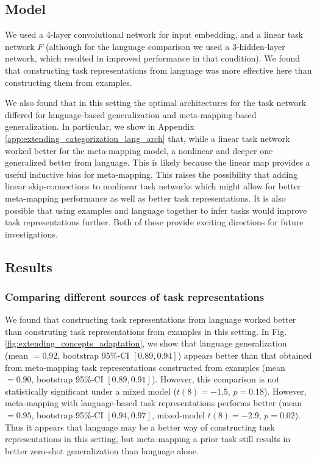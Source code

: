 \subsection{Model}
We used a 4-layer convolutional network for input embedding, and a linear task network \(F\) (although for the language comparison we used a 3-hidden-layer network, which resulted in improved performance in that condition). We found that constructing task representations from language was more effective here than constructing them from examples. \par
We also found that in this setting the optimal architectures for the task network differed for language-based generalization and meta-mapping-based generalization. In particular, we show in Appendix \ref{app:extending_categorization_lang_arch} that, while a linear task network worked better for the meta-mapping model, a nonlinear and deeper one generalized better from language. This is likely because the linear map provides a useful inductive bias for meta-mapping. This raises the possibility that adding linear skip-connections to nonlinear task networks which might allow for better meta-mapping performance as well as better task representations. It is also possible that using examples and language together to infer tasks would improve task representations further. Both of these provide exciting directions for future investigations. \par 

\subsection{Results}

\subsubsection{Comparing different sources of task representations}
We found that constructing task representations from language worked better than construting task representations from examples in this setting. In Fig. \ref{fig:extending_concepts_adaptation}, we show that language generalization (mean \(= 0.92\), bootstrap 95\%-CI \([0.89, 0.94]\)) appears better than that obtained from meta-mapping task representations constructed from examples (mean \(= 0.90\), bootstrap 95\%-CI \([0.89, 0.91]\)). However, this comparison is not statistically significant under a mixed model (\(t(8) = -1.5\), \(p = 0.18\)). However, meta-mapping with language-based task representations performs better (mean \(= 0.95\), bootstrap 95\%-CI \([0.94, 0.97]\), mixed-model \(t(8) = -2.9\), \(p = 0.02\)). Thus it appears that language may be a better way of constructing task representations in this setting, but meta-mapping a prior task still results in better zero-shot generalization than language alone. \par

